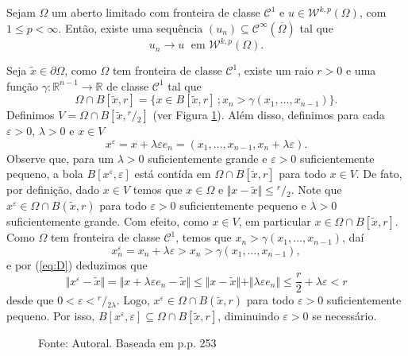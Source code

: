 \documentclass[a4paper, 11pt]{book}
\theoremstyle{definition}
\newcommand{\bR}{\mathbb{R}}
\newcommand{\cC}{\mathcal{C}}
\newcommand{\cW}{\mathcal{W}}
\newcommand{\sfrac}[2]{{}^{#1}\!\!/\!_{#2}}
\begin{document}
\begin{tbox} \label{thm:aprox3}
    Sejam $\Omega$ um aberto limitado com fronteira de classe $\cC^1$ e $u \in \cW^{k,p}(\Omega)$, com $1 \leqslant p < \infty$.
    Então, existe uma sequência $(u_n) \subseteq \cC^\infty(\overline\Omega)$ tal que
    \[
        u_n \to u \;\text{ em } \cW^{k,p}(\Omega).
    \]
\end{tbox}
\begin{prf}
    Seja $\tilde x \in \partial \Omega$, como $\Omega$ tem fronteira de classe $\cC^1$, existe um raio $r > 0$ e uma função $\gamma : \bR^{n-1} \to \bR$ de classe $\cC^1$ tal que
    \begin{equation} \label{eq:E}
        \Omega \cap B[\tilde x, r] = \{x \in B[\tilde x, r] \,; x_n > \gamma(x_1,\dots,x_{n-1})\}.
    \end{equation}
    Definimos $V = \Omega \cap B[\tilde x, \sfrac{r}{2}]$ (ver Figura \ref{fig:conjunto-demonstracao-aprox-3}).
    Além disso, definimos para cada $\varepsilon > 0$, $\lambda > 0$ e $x \in V$
    \begin{equation} \label{eq:D}
        x^\varepsilon = x + \lambda \varepsilon e_n = (x_1,\dots,x_{n-1}, x_n + \lambda\varepsilon).
    \end{equation}
    Observe que, para um $\lambda > 0$ suficientemente grande e $\varepsilon > 0$ suficientemente pequeno, a bola $B[x^\varepsilon\!,\varepsilon]$ está contída em $\Omega \cap B[\tilde x,r]$ para todo $x \in V$.
    De fato, por definição, dado $x \in V$ temos que $x \in \Omega$ e $\Vert x - \tilde x \Vert \leqslant \sfrac{r}{2}$.
    Note que $x^\varepsilon \in \Omega \cap B(\tilde x, r)$ para todo $\varepsilon > 0$ suficientemente pequeno e $\lambda > 0$ suficientemente grande.
    Com efeito, como $x \in V$, em particular $x \in \Omega \cap B[\tilde x, r]$.
    Como $\Omega$ tem fronteira de classe $\cC^1$, temos que $x_n > \gamma(x_1,\dots,x_{n-1})$, daí
    \[
        x^\varepsilon_n = x_n + \lambda \varepsilon > x_n >  \gamma(x_{1},\dots,x_{n-1}),
    \]
    e por (\ref{eq:D}) deduzimos que
    \[
        \Vert x^\varepsilon - \tilde x \Vert = \Vert x + \lambda \varepsilon e_n - \tilde x \Vert \leqslant \Vert x - \tilde x \Vert + \Vert \lambda \varepsilon e_n  \Vert \leqslant \frac{r}{2} + \lambda\varepsilon < r
    \]
    desde que $0 <\varepsilon < \sfrac{r}{2\lambda}$.
    Logo, $x^\varepsilon \in \Omega \cap B(\tilde x, r)$ para todo $\varepsilon > 0$ suficientemente pequeno.
    Por isso,
    $B[x^\varepsilon\!, \varepsilon] \subseteq \Omega \cap B[\tilde x,r]$, diminuindo $\varepsilon > 0$ se necessário.
    \begin{figure}
        \centering
        
        \caption{Fonte: Autoral. Baseada em \cite{evans-pde} p.p. 253}
        \label{fig:conjunto-demonstracao-aprox-3}
    \end{figure}


\end{prf}
\end{document}
